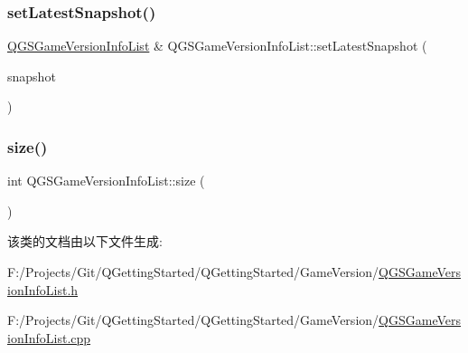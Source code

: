 \mbox{\label{class_q_g_s_game_version_info_list_aaa46bcf75c76262047accb45a42dc930}} 
\subsubsection{\texorpdfstring{set\+Latest\+Snapshot()}{setLatestSnapshot()}}
{\footnotesize\ttfamily \mbox{\hyperlink{class_q_g_s_game_version_info_list}{Q\+G\+S\+Game\+Version\+Info\+List}} \& Q\+G\+S\+Game\+Version\+Info\+List\+::set\+Latest\+Snapshot (\begin{DoxyParamCaption}\item[{const Q\+String \&}]{snapshot }\end{DoxyParamCaption})}

\mbox{\label{class_q_g_s_game_version_info_list_a330087d150f2bc0ee845a4d804fe1843}} 
\subsubsection{\texorpdfstring{size()}{size()}}
{\footnotesize\ttfamily int Q\+G\+S\+Game\+Version\+Info\+List\+::size (\begin{DoxyParamCaption}{ }\end{DoxyParamCaption})}



该类的文档由以下文件生成\+:\begin{DoxyCompactItemize}
\item 
F\+:/\+Projects/\+Git/\+Q\+Getting\+Started/\+Q\+Getting\+Started/\+Game\+Version/\mbox{\hyperlink{_q_g_s_game_version_info_list_8h}{Q\+G\+S\+Game\+Version\+Info\+List.\+h}}\item 
F\+:/\+Projects/\+Git/\+Q\+Getting\+Started/\+Q\+Getting\+Started/\+Game\+Version/\mbox{\hyperlink{_q_g_s_game_version_info_list_8cpp}{Q\+G\+S\+Game\+Version\+Info\+List.\+cpp}}\end{DoxyCompactItemize}
